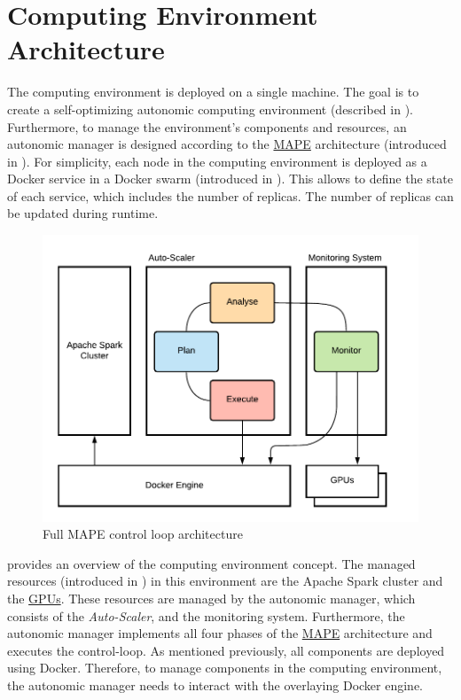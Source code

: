 \section{Computing Environment Architecture}
\label{sec:05_env}
The computing environment is deployed on a single machine.
The goal is to create a self-optimizing autonomic computing environment (described in ).
Furthermore, to manage the environment's components and resources, an autonomic manager is designed according to the \hyperlink{abbr:mape}{MAPE} architecture (introduced in ).
For simplicity, each node in the computing environment is deployed as a Docker service in a Docker swarm (introduced in ).
This allows to define the state of each service, which includes the number of replicas. The number of replicas can be updated during runtime.


\begin{figure}[h]
\centering
\includegraphics[scale=1]{images/05_conceptual_design/autonomic_manager/control_loop}
\caption{Full MAPE control loop architecture}
\label{fig:05_am_monitoring_loop_arch}
\end{figure}
 provides an overview of the computing environment concept.
The managed resources (introduced in ) in this environment are the Apache Spark cluster and the \hyperlink{abbr:gpu}{GPUs}.
These resources are managed by the autonomic manager, which consists of the \textit{Auto-Scaler}, and the monitoring system. Furthermore, the autonomic manager implements all four phases of the \hyperlink{abbr:mape}{MAPE} architecture and executes the control-loop.
As mentioned previously, all components are deployed using Docker. Therefore, to manage components in the computing environment, the autonomic manager needs to interact with the overlaying Docker engine.


